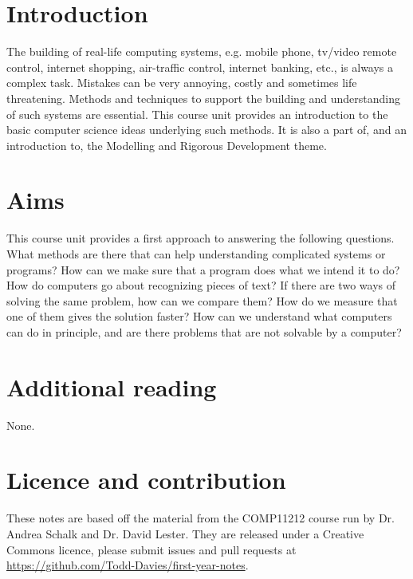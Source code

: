 \section*{Introduction}

The building of real-life computing systems, e.g. mobile phone, tv/video remote
control, internet shopping, air-traffic control, internet banking, etc., is
always a complex task. Mistakes can be very annoying, costly and sometimes life
threatening. Methods and techniques to support the building and understanding of
such systems are essential. This course unit provides an introduction to the
basic computer science ideas underlying such methods. It is also a part of, and
an introduction to, the Modelling and Rigorous Development theme.

\section*{Aims}

This course unit provides a first approach to answering the following questions.
What methods are there that can help understanding complicated systems or
programs? How can we make sure that a program does what we intend it to do? How
do computers go about recognizing pieces of text? If there are two ways of
solving the same problem, how can we compare them? How do we measure that one of
them gives the solution faster? How can we understand what computers can do in
principle, and are there problems that are not solvable by a computer?

\section*{Additional reading}

None.

\section*{Licence and contribution}

These notes are based off the material from the COMP11212 course run by 
Dr. Andrea Schalk and Dr. David Lester. They are released
under a Creative Commons licence, please submit issues and pull requests at
\url{https://github.com/Todd-Davies/first-year-notes}.
